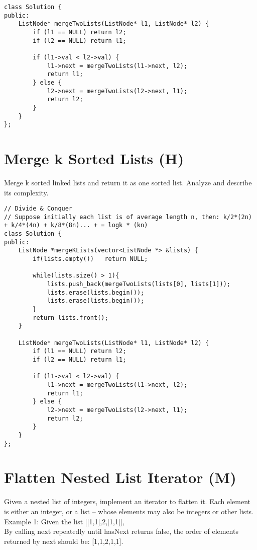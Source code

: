 \begin{lstlisting}
class Solution {
public:
    ListNode* mergeTwoLists(ListNode* l1, ListNode* l2) {
        if (l1 == NULL) return l2;
        if (l2 == NULL) return l1;
        
        if (l1->val < l2->val) {
            l1->next = mergeTwoLists(l1->next, l2);
            return l1;
        } else {
            l2->next = mergeTwoLists(l2->next, l1);
            return l2;
        }
    }
};
\end{lstlisting}


\section{Merge k Sorted Lists (H)}
Merge k sorted linked lists and return it as one sorted list. Analyze and describe its complexity. \\
 
\begin{lstlisting}
// Divide & Conquer
// Suppose initially each list is of average length n, then: k/2*(2n) + k/4*(4n) + k/8*(8n)... + = logk * (kn)
class Solution {
public:
    ListNode *mergeKLists(vector<ListNode *> &lists) {
        if(lists.empty())   return NULL;
        
        while(lists.size() > 1){
            lists.push_back(mergeTwoLists(lists[0], lists[1]));
            lists.erase(lists.begin());
            lists.erase(lists.begin());
        }
        return lists.front();
    }
    
    ListNode* mergeTwoLists(ListNode* l1, ListNode* l2) {
        if (l1 == NULL) return l2;
        if (l2 == NULL) return l1;
        
        if (l1->val < l2->val) {
            l1->next = mergeTwoLists(l1->next, l2);
            return l1;
        } else {
            l2->next = mergeTwoLists(l2->next, l1);
            return l2;
        }
    }
};
\end{lstlisting}


\section{Flatten Nested List Iterator (M)}
Given a nested list of integers, implement an iterator to flatten it. Each element is either an integer, or a list -- whose elements may also be integers or other lists.\\

Example 1: Given the list [[1,1],2,[1,1]],\\
By calling next repeatedly until hasNext returns false, the order of elements returned by next should be: [1,1,2,1,1].\\

